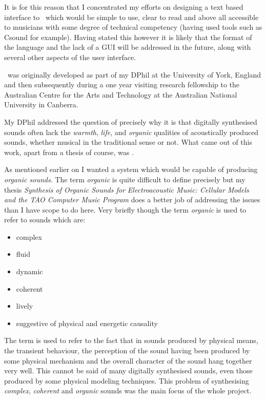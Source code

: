 It is for this reason that I concentrated my efforts on designing a
text based interface to \tao\ which would be simple to use, clear to read
and above all accessible to musicians with some degree of technical
competency (having used tools such as Csound for example). Having
stated this however it is likely that the format of the language and
the lack of a GUI will be addressed in the future, along with several
other aspects of the user interface.

\tao\ was originally developed as part of my DPhil at the
University of York, England and then subsequently during a one year
visiting research fellowship to the Australian Centre for the Arts
and Technology at the Australian National University in Canberra.

My DPhil addressed the question of precisely why it is that digitally
synthesised sounds often lack the \emph{warmth}, \emph{life}, and
\emph{organic} qualities of acoustically produced sounds, whether
musical in the traditional sense or not. What came out of this work,
apart from a thesis of course, was \tao.

As mentioned earlier on I wanted a system which would be capable of producing
\emph{organic sounds}. The term \emph{organic}
is quite difficult to define precisely but my thesis \emph{Synthesis
of Organic Sounds for Electroacoustic Music: Cellular Models and the
TAO Computer Music Program} does a better job of
addressing the issues than I have scope to do here. Very briefly though
the term \emph{organic} is used to refer to sounds which are:

\begin{itemize}
\item complex
\item fluid
\item dynamic
\item coherent
\item lively
\item suggestive of physical and energetic causality
\end{itemize}

The term  is used to refer to the fact that in sounds
produced by physical means, the transient behaviour, the perception
of the sound having been produced by some physical mechanism and
the overall character of the sound hang together very well. This cannot
be said of many digitally synthesised sounds, even those produced by
some physical modeling techniques. This problem of synthesising
\emph{complex}, \emph{coherent} and \emph{organic} sounds was the main
focus of the whole project.

